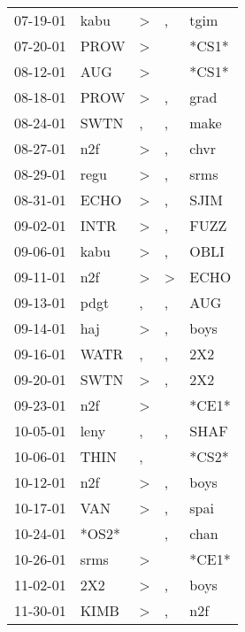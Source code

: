 \begin{supertabular}{lllll}
 07-19-01 &   kabu &     \textgreater &                , &   tgim \\
 07-20-01 &   PROW &     \textgreater &                  &  *CS1* \\
 08-12-01 &    AUG &     \textgreater &                  &  *CS1* \\
 08-18-01 &   PROW &     \textgreater &                , &   grad \\
 08-24-01 &   SWTN &                , &                , &   make \\
 08-27-01 &    n2f &     \textgreater &                , &   chvr \\
 08-29-01 &   regu &     \textgreater &                , &   srms \\
 08-31-01 &   ECHO &     \textgreater &                , &   SJIM \\
 09-02-01 &   INTR &     \textgreater &                , &   FUZZ \\
 09-06-01 &   kabu &     \textgreater &                , &   OBLI \\
 09-11-01 &    n2f &     \textgreater &     \textgreater &   ECHO \\
 09-13-01 &   pdgt &                , &                , &    AUG \\
 09-14-01 &    haj &     \textgreater &                , &   boys \\
 09-16-01 &   WATR &                , &                , &    2X2 \\
 09-20-01 &   SWTN &     \textgreater &                , &    2X2 \\
 09-23-01 &    n2f &     \textgreater &                  &  *CE1* \\
 10-05-01 &   leny &                , &                , &   SHAF \\
 10-06-01 &   THIN &                , &                  &  *CS2* \\
 10-12-01 &    n2f &     \textgreater &                , &   boys \\
 10-17-01 &    VAN &     \textgreater &                , &   spai \\
 10-24-01 &  *OS2* &                  &                , &   chan \\
 10-26-01 &   srms &     \textgreater &                  &  *CE1* \\
 11-02-01 &    2X2 &     \textgreater &                , &   boys \\
 11-30-01 &   KIMB &     \textgreater &                , &    n2f \\

\end{supertabular}

